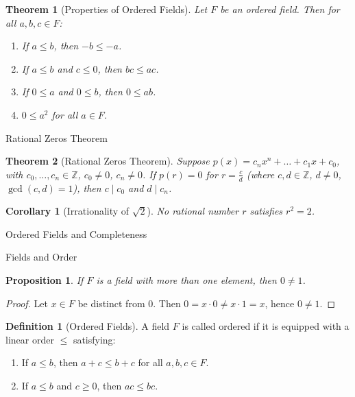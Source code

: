 \documentclass[7pt]{article}
\theoremstyle{definition}
\newtheorem{definition}{Definition}
\theoremstyle{plain}
\newtheorem{theorem}{Theorem}
\newtheorem{proposition}{Proposition}
\newtheorem{corollary}{Corollary}
\begin{document}
\begin{theorem}[Properties of Ordered Fields]
Let $ F $ be an ordered field. Then for all $ a, b, c \in F $:
\begin{enumerate}[label=(\roman*)]
    \item If $ a \leq b $, then $ -b \leq -a $.
    \item If $ a \leq b $ and $ c \leq 0 $, then $ bc \leq ac $.
    \item If $ 0 \leq a $ and $ 0 \leq b $, then $ 0 \leq ab $.
    \item $ 0 \leq a^2 $ for all $ a \in F $.
\end{enumerate}
\end{theorem}

{Rational Zeros Theorem}
\begin{theorem}[Rational Zeros Theorem]
Suppose $ p(x) = c_nx^n + \ldots + c_1x + c_0 $, with $ c_0, \ldots, c_n \in \mathbb{Z} $, $ c_0 \neq 0 $, $ c_n \neq 0 $. If $ p(r) = 0 $ for $ r = \frac{c}{d} $ (where $ c, d \in \mathbb{Z} $, $ d \neq 0 $, $ \gcd(c, d) = 1 $), then $ c \mid c_0 $ and $ d \mid c_n $.
\end{theorem}

\begin{corollary}[Irrationality of $ \sqrt{2} $]
No rational number $ r $ satisfies $ r^2 = 2 $.
\end{corollary}
{Ordered Fields and Completeness}

{Fields and Order}
\begin{proposition}
If $ F $ is a field with more than one element, then $ 0 \neq 1 $.
\end{proposition}
\begin{proof}
Let $ x \in F $ be distinct from $ 0 $. Then $ 0 = x \cdot 0 \neq x \cdot 1 = x $, hence $ 0 \neq 1 $.
\end{proof}

\begin{definition}[Ordered Fields]
A field $ F $ is called ordered if it is equipped with a linear order $ \leq $ satisfying:
\begin{enumerate}[label=(O\arabic*)]
    \item If $ a \leq b $, then $ a + c \leq b + c $ for all $ a, b, c \in F $.
    \item If $ a \leq b $ and $ c \geq 0 $, then $ ac \leq bc $.
\end{enumerate}
\end{definition}

\end{document}
